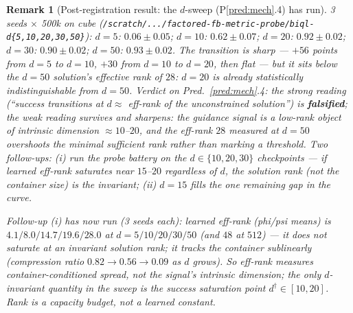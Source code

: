 \documentclass[10pt]{article}
\newtheorem{remark}{Remark}
\begin{document}
\begin{remark}[Post-registration result: the $d$-sweep (P\ref{pred:mech}.4) has run]
\label{rem:dsweep}
3 seeds $\times$ 500k on cube ({\footnotesize\texttt{/scratch/.../factored-fb-metric-probe/biql-d\{5,10,20,30,50\}}}):
$d{=}5$: $0.06\pm0.05$; $d{=}10$: $0.62\pm0.07$; $d{=}20$: $\mathbf{0.92\pm0.02}$;
$d{=}30$: $0.90\pm0.02$; $d{=}50$: $0.93\pm0.02$. The transition is sharp --- $+56$ points
from $d{=}5$ to $d{=}10$, $+30$ from $d{=}10$ to $d{=}20$, then flat --- but it sits
\emph{below} the $d{=}50$ solution's effective rank of $28$: $d{=}20$ is already
statistically indistinguishable from $d{=}50$. Verdict on Pred.~\ref{pred:mech}.4: the
strong reading (``success transitions at $d\approx$ eff-rank of the unconstrained
solution'') is \textbf{falsified}; the weak reading survives and sharpens: the guidance
signal is a low-rank object of intrinsic dimension $\approx 10$--$20$, and the eff-rank
$28$ measured at $d{=}50$ \emph{overshoots} the minimal sufficient rank rather than
marking a threshold. Two follow-ups: (i) run the probe battery on the $d\in\{10,20,30\}$
checkpoints --- if learned eff-rank saturates near $15$--$20$ regardless of $d$, the
solution rank (not the container size) is the invariant; (ii) $d{=}15$ fills the one
remaining gap in the curve.

Follow-up (i) has now run (3 seeds each): learned eff-rank (phi/psi means) is
$4.1/8.0/14.7/19.6/28.0$ at $d=5/10/20/30/50$ (and $48$ at $512$) --- it does \emph{not}
saturate at an invariant solution rank; it tracks the container sublinearly (compression
ratio $0.82\to0.56\to0.09$ as $d$ grows). So eff-rank measures container-conditioned
spread, not the signal's intrinsic dimension; the only $d$-invariant quantity in the sweep
is the \emph{success saturation point} $d^\dagger\!\in\![10,20]$. Rank is a capacity
budget, not a learned constant.
\end{remark}
\end{document}
